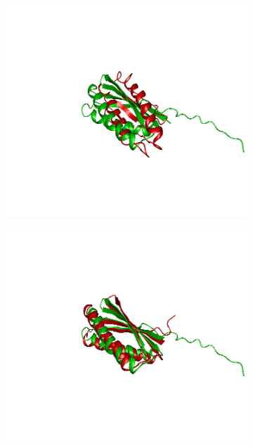 \documentclass[11pt,a4paper]{article}
\begin{document}
\begin{figure}[tbp]
    \begin{center}
        \begin{subfigure}{.4\textwidth}
            \includegraphics[width=\textwidth]{figures/T0769TS442}
        \end{subfigure}
        \begin{subfigure}{.4\textwidth}
            \includegraphics[width=\textwidth]{figures/T0769TS241}
        \end{subfigure}


\end{center}
\end{figure}
\end{document}
